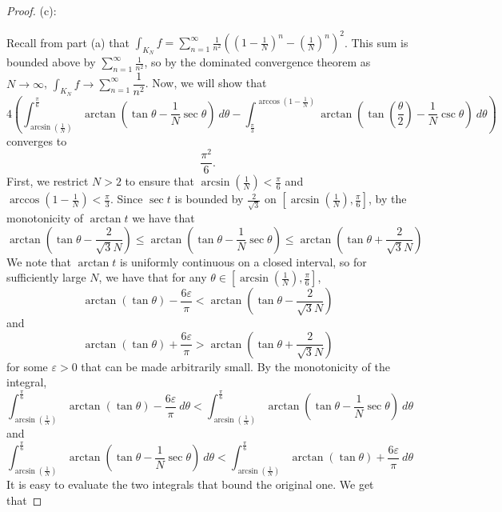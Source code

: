 \documentclass{article}
\theoremstyle{plain} %
\numberwithin{thm}{section} %
\theoremstyle{definition}
\begin{document}
\begin{proof}
    \medskip

    (c):

    Recall from part (a) that \(\int _{K_N} f = \sum_{n=1}^{\infty} \frac{1}{n^2} \left( \left( 1 - \frac{1}{N} \right)^n - \left(\frac{1}{N} \right)^n \right)^2\). This sum is bounded above by \(\sum_{n=1}^{\infty} \frac{1}{n^2}\), so by the dominated convergence theorem as \(N \to \infty\), \(\int _{K_N}f \to \sum\limits_{n=1}^{\infty} \dfrac{1}{n^2}\). Now, we will show that
    \[
        4\left( \int _{\arcsin \left( \frac{1}{N} \right)}^{\frac{\pi}{6}} \arctan \left( \tan \theta - \frac{1}{N}\sec \theta \right) \ d \theta - \int _{\frac{\pi}{3}}^{\arccos \left( 1-\frac{1}{N} \right)} \arctan \left( \tan \left( \frac{\theta}{2} \right) - \frac{1}{N}\csc \theta \right)\ d \theta\right)
    \]
    converges to
    \[
        \frac{\pi^2}{6}.
    \]
    First, we restrict \(N > 2\) to ensure that \(\arcsin \left( \frac{1}{N}\right) < \frac{\pi}{6}\) and \(\arccos \left( 1-\frac{1}{N} \right) < \frac{\pi}{3}\). Since \(\sec t\) is bounded by \(\frac{2}{\sqrt{3}}\) on \(\left[\arcsin \left( \frac{1}{N} \right) , \frac{\pi}{6}\right]\), by the monotonicity of \(\arctan t\) we have that
    \[
        \arctan \left( \tan \theta - \frac{2}{\sqrt{3}N} \right) \leq \arctan \left( \tan \theta - \frac{1}{N}\sec \theta \right) \leq \arctan \left( \tan \theta + \frac{2}{\sqrt{3}N} \right)
    \]
    We note that \(\arctan t\) is uniformly continuous on a closed interval, so for sufficiently large \(N\), we have that for any \(\theta \in \left[ \arcsin \left( \frac{1}{N} \right), \frac{\pi}{6} \right]\),
    \[
        \arctan (\tan \theta) - \frac{6\varepsilon}{\pi} < \arctan \left( \tan \theta - \frac{2}{\sqrt{3}N} \right)
    \]
    and
    \[
        \arctan (\tan \theta) + \frac{6\varepsilon}{\pi} > \arctan \left( \tan \theta + \frac{2}{\sqrt{3}N} \right)
    \]
    for some \(\varepsilon > 0\) that can be made arbitrarily small. By the monotonicity of the integral,
    \[
        \int _{\arcsin \left( \frac{1}{N} \right)}^{\frac{\pi}{6}} \arctan (\tan \theta) - \frac{6\varepsilon}{\pi}\ d \theta < \int _{\arcsin \left( \frac{1}{N} \right)}^{\frac{\pi}{6}} \arctan \left( \tan \theta - \frac{1}{N}\sec \theta \right) \ d \theta
    \]
    and
    \[
        \int _{\arcsin \left( \frac{1}{N} \right)}^{\frac{\pi}{6}} \arctan \left( \tan \theta - \frac{1}{N}\sec \theta \right) \ d \theta < \int _{\arcsin \left( \frac{1}{N} \right)}^{\frac{\pi}{6}} \arctan (\tan \theta) + \frac{6\varepsilon}{\pi}\ d \theta
    \]
    It is easy to evaluate the two integrals that bound the original one. We get that

\end{proof}
\end{document}
